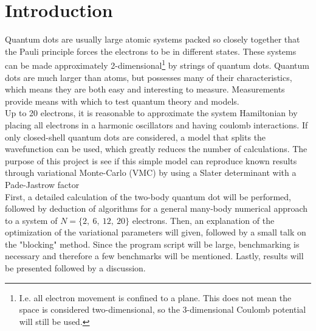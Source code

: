 \documentclass[english, a4paper]{article}
\begin{document}
	\begin{abstract}
		A variational monte-Carlo (VMC) approach to the quantum dot with $N=2,6,12$ and $20$ electrons was studied. The electrons were placed in a harmonic oscillator potential and assumed to interact with each other solely by the Coulomb interaction. This is an expansion of the previous project in which the ground state of a bosonic many-body system was studied. Specifically, the state wavefunction of a closed-shell model of the quantum dot was studied, were we approximate the system wavefunction by a Slater determinant (non-interacting) term and a Pade-Jastrow factor (correlation) term. We find such a simple model give ground state energies with, at most, 1.5 atomic units deviation from the results of \cite{H_Msc}.
	\end{abstract}
	
	
	\tableofcontents
	\newpage
	
	
	\section{Introduction}
	Quantum dots are usually large atomic systems packed so closely together that the Pauli principle forces the electrons to be in different states. These systems can be made approximately 2-dimensional\footnote{I.e. all electron movement is confined to a plane. This does not mean the space is considered two-dimensional, so the 3-dimensional Coulomb potential will still be used.} by strings of quantum dots. Quantum dots are much larger than atoms, but possesses many of their characteristics, which means they are both easy and interesting to measure. Measurements provide means with which to test quantum theory and models.\\
	Up to 20 electrons, it is reasonable to approximate the system Hamiltonian by placing all electrons in a harmonic oscillators and having coulomb interactions. If only closed-shell quantum dots are considered, a model that splits the wavefunction can be used, which greatly reduces the number of calculations. The purpose of this project is see if this simple model can reproduce known results through variational Monte-Carlo (VMC) by using a Slater determinant with a Pade-Jastrow factor\\
	First, a detailed calculation of the two-body quantum dot will be performed, followed by deduction of algorithms for a general many-body numerical approach to a system of $N=\{2,\:6,\:12,\:20\}$ electrons. Then, an explanation of the optimization of the variational parameters will given, followed by a small talk on the "blocking" method. Since the program script will be large, benchmarking is necessary and therefore a few benchmarks will be mentioned. Lastly, results will be presented followed by a discussion.
	
\end{document}

